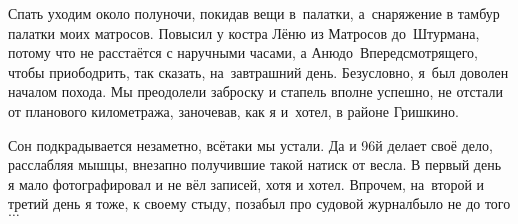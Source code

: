 Спать уходим около полуночи, покидав вещи в~палатки, а~снаряжение в тамбур палатки моих матросов. Повысил у костра Лёню из Матросов до~Штурмана, потому что не расстаётся с наручными часами, а Аню\mdash до~Впередсмотрящего, чтобы приободрить, так сказать, на~завтрашний день. Безусловно, я~был доволен началом похода. Мы преодолели заброску и стапель вполне успешно, не отстали от планового километража, заночевав, как я и~хотел, в районе Гришкино.

Сон подкрадывается незаметно, всё\sdash таки мы устали. Да и 96\sdash й делает своё дело, расслабляя мышцы, внезапно получившие такой натиск от весла. В первый день я мало фотографировал и не вёл записей, хотя и хотел. Впрочем, на~второй и третий день я тоже, к своему стыду, позабыл про судовой журнал\mdash было не до того$\ldots$

\begin{center}
\end{center}
